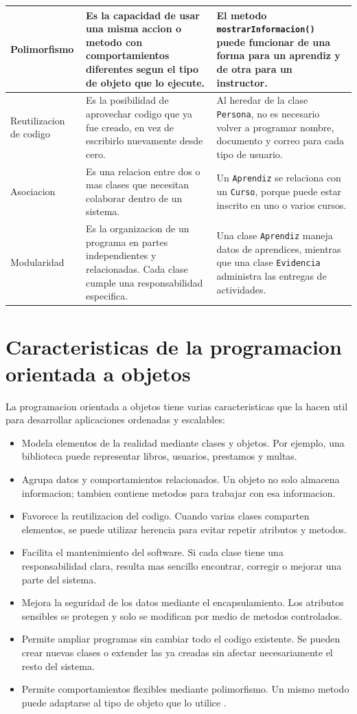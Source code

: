 \documentclass[12pt,letterpaper]{article}
\begin{document}
\begin{longtable}{|p{3cm}|p{7cm}|p{4cm}|}
\hline
Polimorfismo & Es la capacidad de usar una misma accion o metodo con comportamientos diferentes segun el tipo de objeto que lo ejecute. & El metodo \texttt{mostrarInformacion()} puede funcionar de una forma para un aprendiz y de otra para un instructor. \\
\hline
Reutilizacion de codigo & Es la posibilidad de aprovechar codigo que ya fue creado, en vez de escribirlo nuevamente desde cero. & Al heredar de la clase \texttt{Persona}, no es necesario volver a programar nombre, documento y correo para cada tipo de usuario. \\
\hline
Asociacion & Es una relacion entre dos o mas clases que necesitan colaborar dentro de un sistema. & Un \texttt{Aprendiz} se relaciona con un \texttt{Curso}, porque puede estar inscrito en uno o varios cursos. \\
\hline
Modularidad & Es la organizacion de un programa en partes independientes y relacionadas. Cada clase cumple una responsabilidad especifica. & Una clase \texttt{Aprendiz} maneja datos de aprendices, mientras que una clase \texttt{Evidencia} administra las entregas de actividades. \\
\hline
\end{longtable}

\section{Caracteristicas de la programacion orientada a objetos}

La programacion orientada a objetos tiene varias caracteristicas que la hacen util para desarrollar aplicaciones ordenadas y escalables:

\begin{itemize}[leftmargin=1.2cm]
    \item Modela elementos de la realidad mediante clases y objetos. Por ejemplo, una biblioteca puede representar libros, usuarios, prestamos y multas.
    \item Agrupa datos y comportamientos relacionados. Un objeto no solo almacena informacion; tambien contiene metodos para trabajar con esa informacion.
    \item Favorece la reutilizacion del codigo. Cuando varias clases comparten elementos, se puede utilizar herencia para evitar repetir atributos y metodos.
    \item Facilita el mantenimiento del software. Si cada clase tiene una responsabilidad clara, resulta mas sencillo encontrar, corregir o mejorar una parte del sistema.
    \item Mejora la seguridad de los datos mediante el encapsulamiento. Los atributos sensibles se protegen y solo se modifican por medio de metodos controlados.
    \item Permite ampliar programas sin cambiar todo el codigo existente. Se pueden crear nuevas clases o extender las ya creadas sin afectar necesariamente el resto del sistema.
    \item Permite comportamientos flexibles mediante polimorfismo. Un mismo metodo puede adaptarse al tipo de objeto que lo utilice \parencite{unamPOO,microsoftOOP}.
\end{itemize}
\end{document}
